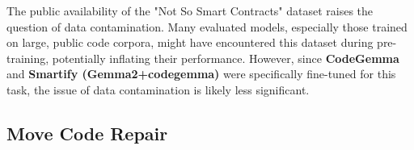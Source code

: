 The public availability of the "Not So Smart Contracts" dataset raises the question of data contamination. Many evaluated models, especially those trained on large, public code corpora, might have encountered this dataset during pre-training, potentially inflating their performance. However, since \textbf{CodeGemma} and \textbf{Smartify (Gemma2+codegemma)} were specifically fine-tuned for this task, the issue of data contamination is likely less significant.



\subsection{Move Code Repair}\label{sec:move_code_repair}

